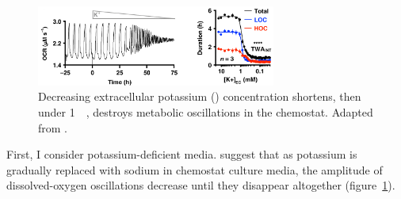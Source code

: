 \begin{figure}
  \centering
  \includegraphics[width=0.7\textwidth]{oneillEukaryoticCellBiology2020_4_adapted.png}
  \caption{
    Decreasing extracellular potassium () concentration shortens, then under \SI{1}{\milli\molar}, destroys metabolic oscillations in the chemostat.
    Adapted from \textcite{oneillEukaryoticCellBiology2020}.
  }
  \label{fig:biology-kdeficient-oneill}
\end{figure}

First, I consider potassium-deficient media.
\textcite{oneillEukaryoticCellBiology2020} suggest that as potassium is gradually replaced with sodium in chemostat culture media, the amplitude of dissolved-oxygen oscillations decrease until they disappear altogether (figure~\ref{fig:biology-kdeficient-oneill}).


